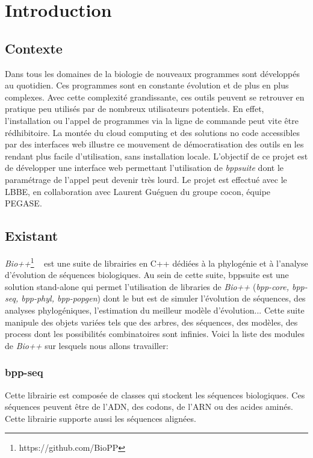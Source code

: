 \section{Introduction}

\subsection{Contexte}
	Dans tous les domaines de la biologie de nouveaux programmes sont développés au quotidien. Ces programmes sont en constante évolution et de plus en plus complexes. Avec cette complexité grandissante, ces outils peuvent se retrouver en pratique peu utilisés par de nombreux utilisateurs potentiels. En effet, l'installation ou l'appel de programmes via la ligne de commande peut vite être rédhibitoire.
	La montée du cloud computing et des solutions no code accessibles par des interfaces web illustre ce mouvement de démocratisation des outils en les rendant plus facile d'utilisation, sans installation locale.
	L'objectif de ce projet est de développer une interface web permettant l'utilisation de \textit{bppsuite} dont le paramétrage de l'appel peut devenir très lourd.
	Le projet est effectué avec le LBBE, en collaboration avec Laurent Guéguen du groupe cocon, équipe PEGASE.
	
	
\subsection{Existant}
	\textit{Bio++}\footnote{https://github.com/BioPP} ~\cite{Guéguen} est une suite de librairies en C++ dédiées à la phylogénie et à l'analyse d'évolution de séquences biologiques. Au sein de cette suite, bppsuite est une solution stand-alone qui permet l'utilisation de libraries de \textit{Bio++} (\textit{bpp-core, bpp-seq, bpp-phyl, bpp-popgen}) dont le but est de simuler l'évolution de séquences, des analyses phylogéniques, l'estimation du meilleur modèle d'évolution... Cette suite manipule des objets variées tels que des arbres, des séquences, des modèles, des process dont les possibilités combinatoires sont infinies. Voici la liste des modules de \textit{Bio++} sur lesquels nous allons travailler:
	
	\subsubsection*{bpp-seq}
	Cette librairie est composée de classes qui stockent les séquences biologiques. Ces séquences peuvent être de l'ADN, des codons, de l'ARN ou des acides aminés. Cette librairie supporte aussi les séquences alignées.
	
